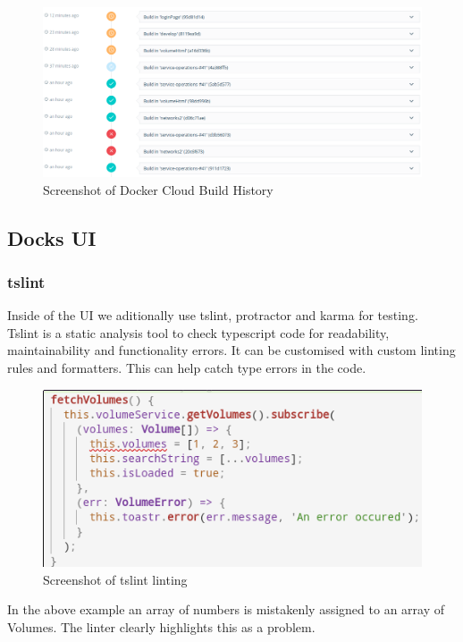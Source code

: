 \documentclass[]{article}
\begin{document}
\begin{figure}[H]
	\centering
	\includegraphics[scale=0.5]{docker_cloud_build_history.png}
	\caption{Screenshot of Docker Cloud Build History}
\end{figure}

\subsection{Docks UI}

\subsubsection{tslint}
Inside of the UI we aditionally use tslint, protractor and karma for testing.
\\
Tslint is a static analysis tool to check typescript code for readability, maintainability and functionality errors.
It can be customised with custom linting rules and formatters.
This can help catch type errors in the code.
\begin{figure}[H]
	\centering
	\includegraphics[scale=0.5]{tslint_error.png}
	\caption{Screenshot of tslint linting}
\end{figure}

In the above example an array of numbers is mistakenly assigned to an array of Volumes. 
The linter clearly highlights this as a problem.
\end{document}

